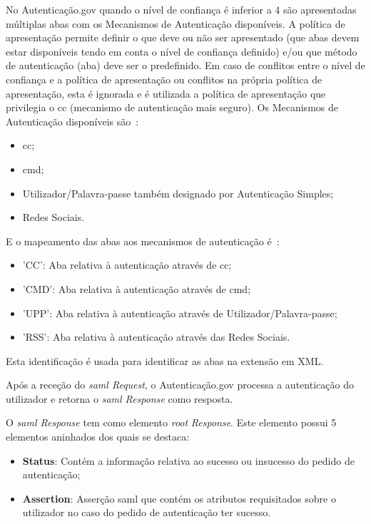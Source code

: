 \begin{itemize}
\begin{itemize}
        No Autenticação.gov quando o nível de confiança é inferior a 4 são apresentadas múltiplas abas com os 
        Mecanismos de Autenticação disponíveis. A política de apresentação permite definir o que deve ou não ser 
        apresentado (que abas devem estar disponíveis tendo em conta o nível de confiança definido) e/ou que 
        método de autenticação (aba) deve ser o predefinido. Em caso de conflitos entre o nível de confiança e a 
        política de apresentação ou conflitos na própria política de apresentação, esta é ignorada e é utilizada 
        a política de apresentação que privilegia o \acrshort{cc} (mecanismo de autenticação mais seguro). 
        Os Mecanismos de Autenticação disponíveis são~\cite{agov2}:
            \begin{itemize}
                \item \acrlong{cc};
                \item \acrlong{cmd};
                \item Utilizador/Palavra-passe também designado por Autenticação Simples;
                \item Redes Sociais.
            \end{itemize}
            E o mapeamento das abas aos mecanismos de autenticação é~\cite{agov2}:
            \begin{itemize}
                \item 'CC': Aba relativa à autenticação através de \acrlong{cc};
                \item 'CMD': Aba relativa à autenticação através de \acrlong{cmd};
                \item 'UPP': Aba relativa à autenticação através de Utilizador/Palavra-passe;
                \item 'RSS': Aba relativa à autenticação através das Redes Sociais.
            \end{itemize}
            Esta identificação é usada para identificar as abas na extensão em XML.
    \end{itemize}
\end{itemize}

Após a receção do \textit{\acrshort{saml} Request}, o Autenticação.gov processa a autenticação do utilizador 
e retorna o \textit{\acrshort{saml} Response} como resposta.

O \textit{\acrshort{saml} Response} tem como elemento \textit{root} \textit{Response}.
Este elemento possui 5 elementos aninhados dos quais se destaca:
\begin{itemize}
    \item \textbf{Status}: Contém a informação relativa ao sucesso ou insucesso do pedido de autenticação;
    \item \textbf{Assertion}: Asserção \acrshort{saml} que contém os atributos requisitados sobre o utilizador 
    no caso do pedido de autenticação ter sucesso.
\end{itemize}

